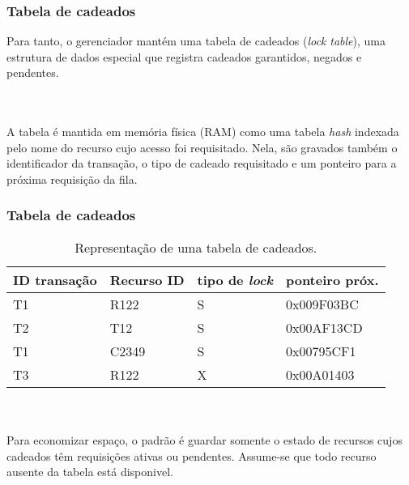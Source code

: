 \documentclass{beamer}
\begin{document}

\begin{frame}
    \frametitle{Tabela de cadeados}
    Para tanto, o gerenciador mantém uma tabela de cadeados (\emph{lock table}), uma estrutura de dados especial que registra cadeados garantidos, negados e pendentes.

    \\~\\
    A tabela é mantida em memória física (RAM) como uma tabela \emph{hash} indexada pelo nome do recurso cujo acesso foi requisitado. Nela, são gravados também o identificador da transação, o tipo de cadeado requisitado e um ponteiro para a próxima requisição da fila.
\end{frame}

\begin{frame}
    \frametitle{Tabela de cadeados}

    \begin{table}
    \begin{tabular}{l l l l}
        \toprule

        \textbf{ID transação} & \textbf{Recurso ID} & \textbf{tipo de \emph{lock}} & \textbf{ponteiro próx.}\\

        \midrule

        T1 & R122 & S & 0x009F03BC \\
        T2 & T12 & S & 0x00AF13CD \\
        T1 & C2349 & S & 0x00795CF1 \\
        T3 & R122 & X & 0x00A01403 \\

        \bottomrule
    \end{tabular}
    \caption{Representação de uma tabela de cadeados.}
    \end{table}

    \\~\\
    Para economizar espaço, o padrão é guardar somente o estado de recursos cujos cadeados têm requisições ativas ou pendentes. Assume-se que todo recurso ausente da tabela está disponivel.
\end{frame}
    
    
\end{document}
